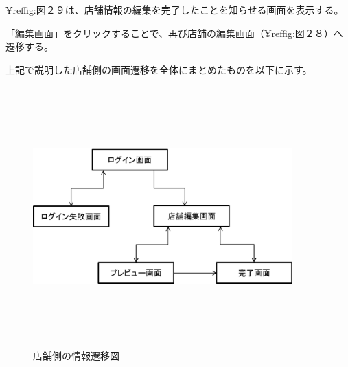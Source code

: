 \documentclass[a4j,titlepage]{jarticle}
\begin{document}
¥ref{fig:図２９}は、店舗情報の編集を完了したことを知らせる画面を表示する。



「編集画面」をクリックすることで、再び店舗の編集画面（¥ref{fig:図２８}）へ遷移する。
\clearpage

上記で説明した店舗側の画面遷移を全体にまとめたものを以下に示す。
\begin {figure}[!htbp]
    \begin{center}
    \includegraphics [height=10cm, width=10cm]{32.eps}
    \caption {店舗側の情報遷移図}
    \label {fig:32}
    \end{center}
\end {figure}
\end{document}
